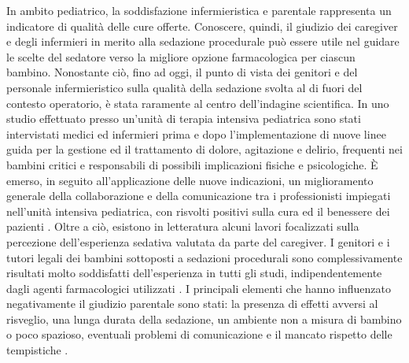 In ambito pediatrico, la soddisfazione infermieristica e parentale rappresenta un indicatore di qualità delle cure offerte. Conoscere, quindi, il giudizio dei caregiver e degli infermieri in merito alla sedazione procedurale può essere utile nel guidare le scelte del sedatore verso la migliore opzione farmacologica per ciascun bambino. Nonostante ciò, fino ad oggi, il punto di vista dei genitori e del personale infermieristico sulla qualità della sedazione svolta al di fuori del contesto operatorio, è stata raramente al centro dell'indagine scientifica. In uno studio effettuato presso un'unità di terapia intensiva pediatrica sono stati intervistati medici ed infermieri prima e dopo l'implementazione di nuove linee guida per la gestione ed il trattamento di dolore, agitazione e delirio, frequenti nei bambini critici e responsabili di possibili implicazioni fisiche e psicologiche. \`E emerso, in seguito all'applicazione delle nuove indicazioni, un miglioramento generale della collaborazione e della comunicazione tra i professionisti impiegati nell'unità intensiva pediatrica, con risvolti positivi sulla cura ed il benessere dei pazienti \citep{Staveski2017}. Oltre a ciò, esistono in letteratura alcuni lavori focalizzati sulla percezione dell'esperienza sedativa valutata da parte del caregiver. I genitori e i tutori legali dei bambini sottoposti a sedazioni procedurali sono complessivamente risultati molto soddisfatti dell'esperienza in tutti gli studi, indipendentemente dagli agenti farmacologici utilizzati \citep{Connor2014, Lew2010, Cortellazzo2022}. I principali elementi che hanno influenzato negativamente il giudizio parentale sono stati: la presenza di effetti avversi al risveglio, una lunga durata della sedazione, un ambiente non a misura di bambino o poco spazioso, eventuali problemi di comunicazione e il mancato rispetto delle tempistiche \citep{Lew2010, Connor2014}.
